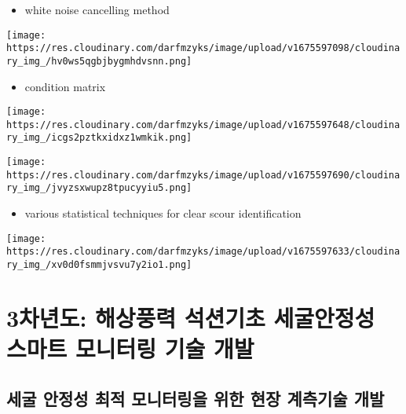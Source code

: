\documentclass[
  letterpaper,
  DIV=11,
  numbers=noendperiod]{scrreprt}
\providecommand{\tightlist}{%
  \setlength{\itemsep}{0pt}\setlength{\parskip}{0pt}}\usepackage{longtable,booktabs,array}
\begin{document}
\begin{itemize}
\tightlist
\item
  white noise cancelling method
\end{itemize}

\texttt{[image: https://res.cloudinary.com/darfmzyks/image/upload/v1675597098/cloudinary\_img\_/hv0ws5qgbjbygmhdvsnn.png]}

\begin{itemize}
\tightlist
\item
  condition matrix
\end{itemize}

\texttt{[image: https://res.cloudinary.com/darfmzyks/image/upload/v1675597648/cloudinary\_img\_/icgs2pztkxidxz1wmkik.png]}

\texttt{[image: https://res.cloudinary.com/darfmzyks/image/upload/v1675597690/cloudinary\_img\_/jvyzsxwupz8tpucyyiu5.png]}

\begin{itemize}
\tightlist
\item
  various statistical techniques for clear scour identification
\end{itemize}

\texttt{[image: https://res.cloudinary.com/darfmzyks/image/upload/v1675597633/cloudinary\_img\_/xv0d0fsmmjvsvu7y2io1.png]}

\hypertarget{uxcc28uxb144uxb3c4-uxd574uxc0c1uxd48duxb825-uxc11duxc158uxae30uxcd08-uxc138uxad74uxc548uxc815uxc131-uxc2a4uxb9c8uxd2b8-uxbaa8uxb2c8uxd130uxb9c1-uxae30uxc220-uxac1cuxbc1c}{%
\section{\texorpdfstring{\textbf{3차년도:} 해상풍력 석션기초 세굴안정성
스마트 모니터링 기술
개발}{3차년도: 해상풍력 석션기초 세굴안정성 스마트 모니터링 기술 개발}}\label{uxcc28uxb144uxb3c4-uxd574uxc0c1uxd48duxb825-uxc11duxc158uxae30uxcd08-uxc138uxad74uxc548uxc815uxc131-uxc2a4uxb9c8uxd2b8-uxbaa8uxb2c8uxd130uxb9c1-uxae30uxc220-uxac1cuxbc1c}}

\hypertarget{uxc138uxad74-uxc548uxc815uxc131-uxcd5cuxc801-uxbaa8uxb2c8uxd130uxb9c1uxc744-uxc704uxd55c-uxd604uxc7a5-uxacc4uxce21uxae30uxc220-uxac1cuxbc1c}{%
\subsection{세굴 안정성 최적 모니터링을 위한 현장 계측기술
개발}\label{uxc138uxad74-uxc548uxc815uxc131-uxcd5cuxc801-uxbaa8uxb2c8uxd130uxb9c1uxc744-uxc704uxd55c-uxd604uxc7a5-uxacc4uxce21uxae30uxc220-uxac1cuxbc1c}}
\end{document}
